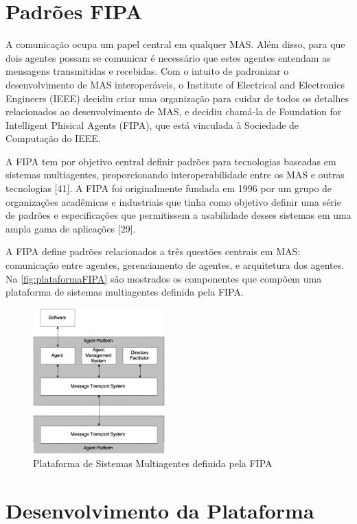 \documentclass[journal]{IEEEtran}
\begin{document}
\section{Padrões FIPA}

A comunicação ocupa um papel central em qualquer MAS. Além disso, para que dois agentes possam se comunicar é necessário que estes agentes entendam as mensagens transmitidas e recebidas. Com o intuito de padronizar o desenvolvimento de MAS interoperáveis, o Institute of Electrical and Electronics Engineers (IEEE) decidiu criar uma organização para cuidar de todos os detalhes relacionados ao desenvolvimento de MAS, e decidiu chamá-la de Foundation for Intelligent Phisical Agents (FIPA), que está vinculada à Sociedade de Computação do IEEE.

A FIPA tem por objetivo central definir padrões para tecnologias baseadas em sistemas multiagentes, proporcionando interoperabilidade entre os MAS e outras tecnologias [41]. A FIPA foi originalmente fundada em 1996 por um grupo de organizações acadêmicas e industriais que tinha como objetivo definir uma série de padrões e especificações que permitissem a usabilidade desses sistemas em uma ampla gama de aplicações [29].

A FIPA define padrões relacionados a três questões centrais em MAS: comunicação entre agentes, gerenciamento de agentes, e arquitetura dos agentes. Na \autoref{fig:plataformaFIPA} são mostrados os componentes que compõem uma plataforma de sistemas multiagentes definida pela FIPA.

\begin{figure}[htb]
    \centering
    \includegraphics[width=2.0in]{Figuras/plataforma.png}
    \caption{\label{fig:plataformaFIPA}Plataforma de Sistemas Multiagentes definida pela FIPA}
\end{figure}

\section{Desenvolvimento da Plataforma}
\end{document}
